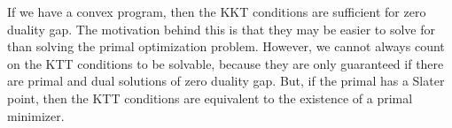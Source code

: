 If we have a convex program, then the KKT conditions are sufficient for zero duality gap. The
motivation behind this is that they may be easier to solve for than solving the primal optimization
problem. However, we cannot always count on the KTT conditions to be solvable, because they are only
guaranteed if there are primal and dual solutions of zero duality gap. But, if the primal has a Slater
point,
then the KTT conditions are equivalent to the existence of a primal minimizer.
